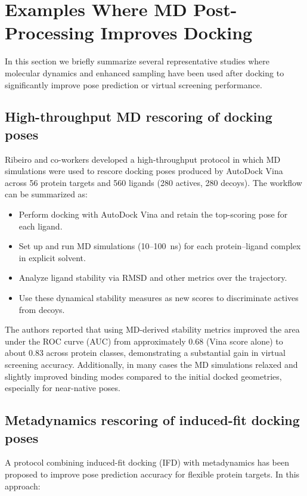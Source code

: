 \documentclass[12pt,a4paper]{article}
\begin{document}
\section{Examples Where MD Post-Processing Improves Docking}

In this section we briefly summarize several representative studies where molecular dynamics and enhanced sampling have been used after docking to significantly improve pose prediction or virtual screening performance.

\subsection{High-throughput MD rescoring of docking poses}

Ribeiro and co-workers developed a high-throughput protocol in which MD simulations were used to rescore docking poses produced by AutoDock Vina across 56 protein targets and 560 ligands (280 actives, 280 decoys).\cite{Khuttan2020} The workflow can be summarized as:

\begin{itemize}
\item Perform docking with AutoDock Vina and retain the top-scoring pose for each ligand.
\item Set up and run MD simulations (10--100~ns) for each protein--ligand complex in explicit solvent.
\item Analyze ligand stability via RMSD and other metrics over the trajectory.
\item Use these dynamical stability measures as new scores to discriminate actives from decoys.
\end{itemize}

The authors reported that using MD-derived stability metrics improved the area under the ROC curve (AUC) from approximately 0.68 (Vina score alone) to about 0.83 across protein classes, demonstrating a substantial gain in virtual screening accuracy.\cite{Khuttan2020} Additionally, in many cases the MD simulations relaxed and slightly improved binding modes compared to the initial docked geometries, especially for near-native poses.

\subsection{Metadynamics rescoring of induced-fit docking poses}

A protocol combining induced-fit docking (IFD) with metadynamics has been proposed to improve pose prediction accuracy for flexible protein targets.\cite{Capelli2022} In this approach:
\end{document}
